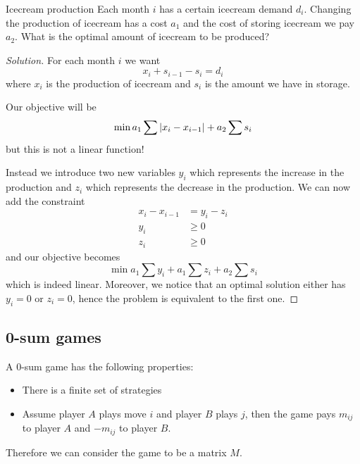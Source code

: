 \documentclass[12pt]{extarticle}
\begin{document}
\begin{example}{Icecream production}{}
	Each month $i$ has a certain icecream demand $d_i$.
	Changing the production of icecream has a cost $a_1$ and the cost of storing icecream we pay $a_2$.
	What is the optimal amount of icecream to be produced?
\end{example}

\begin{proof}[Solution]
	For each month $i$ we want
	\begin{equation}
		x_i + s_{i-1} - s_i = d_i
	\end{equation}
	where $x_i$ is the production of icecream and $s_i$ is the amount we have in storage.

	Our objective will be
	\begin{equation}
		\min a_1 \sum \abs{x_i - x_{i-1}} + a_2 \sum s_i
	\end{equation}
	but this is not a linear function!

	Instead we introduce two new variables $y_i$ which represents the increase in the production
	and $z_i$ which represents the decrease in the production.
	We can now add the constraint
	\begin{align}
		x_i - {x_{i-1}} & = y_i - z_i \\
		y_i             & \geq 0      \\
		z_i             & \geq 0
	\end{align}
	and our objective becomes
	\begin{equation}
		\min a_1 \sum y_i + a_1 \sum z_i + a_2 \sum s_i
	\end{equation}
	which is indeed linear.
	Moreover, we notice that an optimal solution either has $y_i = 0$ or $z_i = 0$,
	hence the problem is equivalent to the first one.
\end{proof}

\subsection{0-sum games}

A 0-sum game has the following properties:
\begin{itemize}
	\item There is a finite set of strategies
	\item Assume player $A$ plays move $i$ and player $B$ plays $j$,
	      then the game pays $m_{ij}$ to player $A$ and $-m_{ij}$ to player $B$.
\end{itemize}
Therefore we can consider the game to be a matrix $M$.
\end{document}
